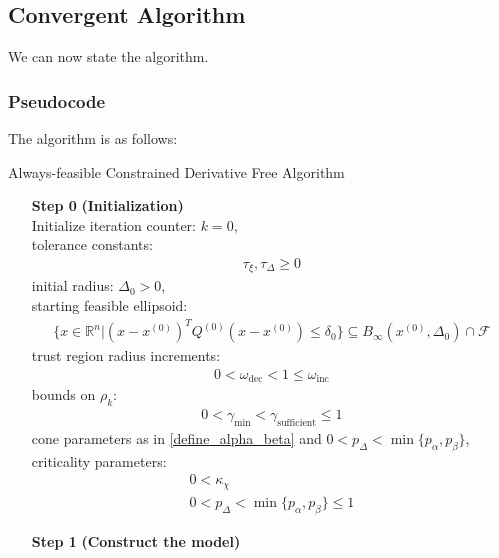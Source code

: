 \documentclass{article}
\theoremstyle{case}
\numberwithin{theorem}{subsection}
\newcommand{\activeconstraintsk}{{\mathbb A_{k}}}
\newcommand{\feasible}{{\mathcal F}}
\newcommand{\gammabi}{\gamma_{\textrm{sufficient}}}
\newcommand{\gammasm}{\gamma_{\textrm{min}}}
\newcommand{\omegadec}{\omega_{\text{dec}}}
\newcommand{\omegainc}{\omega_{\text{inc}}}
\newcommand{\rk}{\rho_k}
\newcommand{\Rn}{\mathbb R^n}
\newcommand{\tolcrit}{\tau_{\xi}}
\newcommand{\tolrad}{\tau_{\Delta}}
\begin{document}
\subsection{Convergent Algorithm}

We can now state the algorithm.


\subsubsection{Pseudocode}
The algorithm is as follows:

\begin{algorithm}[H]
    \caption{Always-feasible Constrained Derivative Free Algorithm}
    \label{constrained_dfo}
    \begin{itemize}
        \item[\textbf{Step 0}] \textbf{(Initialization)} \\
        	Initialize iteration counter: $k=0$, \\
            tolerance constants: 
\begin{align}
            \tolcrit, \tolrad \ge 0 \label{define_algorithm_tolerances}
\end{align}
            initial radius: $\Delta_0 > 0$, \\
            starting feasible ellipsoid: \begin{align}
            \{x \in\Rn | (x - x^{(0)})^T Q^{(0)} (x - x^{(0)}) \le \delta_0 \} \subseteq B_{\infty}\left(x^{(0)}, \Delta_{0}\right) \cap \feasible
            \end{align}
            trust region radius increments:
\begin{align}
0 < \omegadec < 1 \le \omegainc		\label{define_the_omegas}
\end{align}
            bounds on $\rk$:
\begin{align}
0 < \gammasm < \gammabi \le 1	\label{define_the_gammas}
\end{align}
            cone parameters as in \cref{define_alpha_beta} and
            $0 < p_{\Delta} < \min\{p_{\alpha}, p_{\beta}\}$, \\
            criticality parameters:
\begin{align}
0 < \kappa_{\chi} \label{define_kappa_chi} \\
0 < p_{\Delta} < \min\{p_{\alpha}, p_{\beta}\} \le 1 \label{define_p_delta} 
\end{align}
            
        \item[\textbf{Step 1}] \textbf{(Construct the model)} \\
        

\end{itemize}
\end{algorithm}
\end{document}
